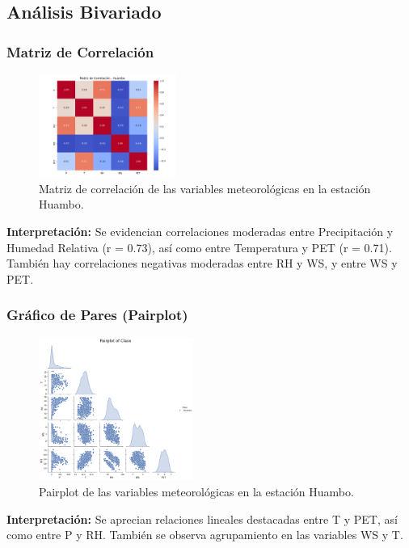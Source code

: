 \subsection{Análisis Bivariado}

\subsubsection*{Matriz de Correlación}
\begin{figure}[H]
\centering
\includegraphics[width=0.4\textwidth]{resultados/por_estacion_meteorologica/Huambo/matriz_correlacion.png}
\caption{Matriz de correlación de las variables meteorológicas en la estación Huambo.}
\label{fig:huambo_corr}
\end{figure}
\textbf{Interpretación:} Se evidencian correlaciones moderadas entre Precipitación y Humedad Relativa (r = 0.73), así como entre Temperatura y PET (r = 0.71). También hay correlaciones negativas moderadas entre RH y WS, y entre WS y PET.

\subsubsection*{Gráfico de Pares (Pairplot)}
\begin{figure}[H]
\centering
\includegraphics[width=0.45\textwidth]{resultados/por_estacion_meteorologica/Huambo/pairplot.png}
\caption{Pairplot de las variables meteorológicas en la estación Huambo.}
\label{fig:huambo_pairplot}
\end{figure}
\textbf{Interpretación:} Se aprecian relaciones lineales destacadas entre T y PET, así como entre P y RH. También se observa agrupamiento en las variables WS y T.



